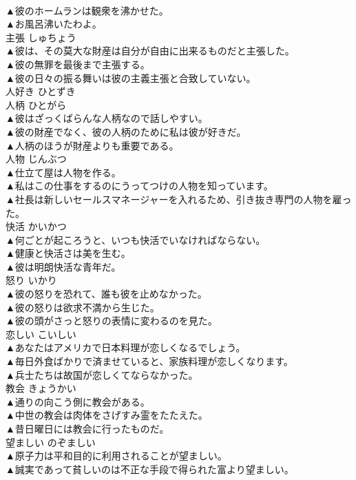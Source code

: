 \documentclass[8pt]{extreport}
\begin{document}
\begin{CJK}{UTF8}{min}
\\	▲彼のホームランは観衆を沸かせた。 
\\	▲お風呂沸いたわよ。 
\\	主張	しゅちょう	
\\	▲彼は、その莫大な財産は自分が自由に出来るものだと主張した。 
\\	▲彼の無罪を最後まで主張する。 
\\	▲彼の日々の振る舞いは彼の主義主張と合致していない。 
\\	人好き	ひとずき	
\\	人柄	ひとがら	
\\	▲彼はざっくばらんな人柄なので話しやすい。 
\\	▲彼の財産でなく、彼の人柄のために私は彼が好きだ。 
\\	▲人柄のほうが財産よりも重要である。 
\\	人物	じんぶつ	
\\	▲仕立て屋は人物を作る。 
\\	▲私はこの仕事をするのにうってつけの人物を知っています。 
\\	▲社長は新しいセールスマネージャーを入れるため、引き抜き専門の人物を雇った。 
\\	快活	かいかつ	
\\	▲何ごとが起ころうと、いつも快活でいなければならない。 
\\	▲健康と快活さは美を生む。 
\\	▲彼は明朗快活な青年だ。 
\\	怒り	いかり	
\\	▲彼の怒りを恐れて、誰も彼を止めなかった。 
\\	▲彼の怒りは欲求不満から生じた。 
\\	▲彼の頭がさっと怒りの表情に変わるのを見た。 
\\	恋しい	こいしい	
\\	▲あなたはアメリカで日本料理が恋しくなるでしょう。 
\\	▲毎日外食ばかりで済ませていると、家族料理が恋しくなります。 
\\	▲兵士たちは故国が恋しくてならなかった。 
\\	教会	きょうかい	
\\	▲通りの向こう側に教会がある。 
\\	▲中世の教会は肉体をさげすみ霊をたたえた。 
\\	▲昔日曜日には教会に行ったものだ。 
\\	望ましい	のぞましい	
\\	▲原子力は平和目的に利用されることが望ましい。 
\\	▲誠実であって貧しいのは不正な手段で得られた富より望ましい。 

\end{CJK}
\end{document}
